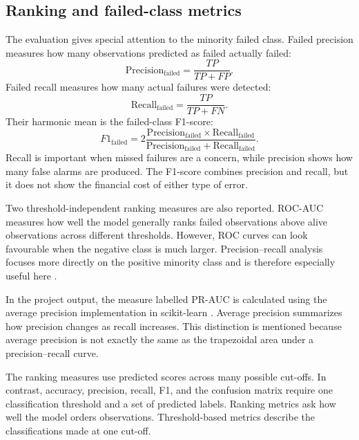 \documentclass[11pt,a4paper]{article}
\begin{document}
\subsection{Ranking and failed-class metrics}

The evaluation gives special attention to the minority failed class. Failed
precision measures how many observations predicted as failed actually failed:
\begin{equation}
  \text{Precision}_{\text{failed}} = \frac{TP}{TP+FP}.
\end{equation}
Failed recall measures how many actual failures were detected:
\begin{equation}
  \text{Recall}_{\text{failed}} = \frac{TP}{TP+FN}.
\end{equation}
Their harmonic mean is the failed-class F1-score:
\begin{equation}
  F1_{\text{failed}}
  = 2\frac{\text{Precision}_{\text{failed}}
  \times \text{Recall}_{\text{failed}}}
  {\text{Precision}_{\text{failed}}+\text{Recall}_{\text{failed}}}.
\end{equation}
Recall is important when missed failures are a concern, while precision shows
how many false alarms are produced. The F1-score combines precision and recall,
but it does not show the financial cost of either type of error.

Two threshold-independent ranking measures are also reported. ROC-AUC measures
how well the model generally ranks failed observations above alive observations
across different thresholds. However, ROC curves can look
favourable when the negative class is much larger. Precision--recall analysis
focuses more directly on the positive minority class and is therefore especially
useful here \citep{davis2006}.

In the project output, the measure labelled PR-AUC is calculated using the
average precision implementation in scikit-learn \citep{pedregosa2011}.
Average precision summarizes how precision changes as recall increases. This
distinction is mentioned because average precision is not exactly the same as
the trapezoidal area under a precision--recall curve.

The ranking measures use predicted scores across many possible cut-offs. In
contrast, accuracy, precision, recall, F1, and the confusion matrix require one
classification threshold and a set of predicted labels. Ranking metrics ask how
well the model orders observations. Threshold-based metrics describe the
classifications made at one cut-off.
\end{document}
